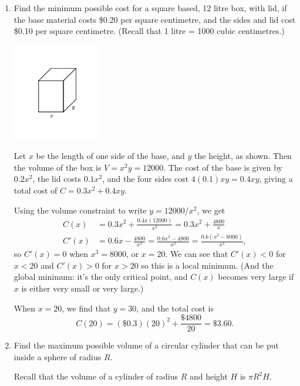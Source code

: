 \documentclass[12pt]{article}
\begin{document}
\begin{enumerate}
   \item Find the minimum possible cost for a square based, 12 litre box, with lid, if the base material costs \$0.20 per square centimetre, and the sides and lid cost \$0.10 per square centimetre. (Recall that 1 litre = 1000 cubic centimetres.)

  \begin{multicols}{2}
  \begin{center}
  \includegraphics[width=0.3\textwidth]{Tut9-5sol}
  \end{center}
  
\columnbreak  
  
  Let $x$ be the length of one side of the base, and $y$ the height, as shown. Then the volume of the box is $V=x^2y=12000$. The cost of the base is given by $0.2x^2$, the lid costs $0.1x^2$, and the four sides cost $4(0.1)xy=0.4xy$, giving a total cost of $C=0.3x^2+0.4xy$.
 \end{multicols}
  Using the volume constraint to write $y=12000/x^2$, we get
  \begin{align*}
  C(x) &= 0.3x^2+\frac{0.4x(12000)}{x^2} = 0.3x^2+\frac{4800}{x}\\
  C'(x) & = 0.6x-\frac{4800}{x^2} = \frac{0.6x^3-4800}{x^2} = \frac{0.6(x^3-8000)}{x^2},
  \end{align*}
  so $C'(x) = 0$ when $x^3=8000$, or $x=20$. We can see that $C'(x)<0$ for $x<20$ and $C'(x)>0$ for $x>20$ so this is a local minimum. (And the global minimum: it's the only critical point, and $C(x)$ becomes very large if $x$ is either very small or very large.)
  
  When $x=20$, we find that $y=30$, and the total cost is
  \[
  C(20) = (\$ 0.3)(20)^2+\frac{\$ 4800}{20} = \$ 3.60.
  \]
  
  
  \item Find the maximum possible volume of a circular cylinder that can be put inside a sphere of radius $R$.
  
  Recall that the volume of a cylinder of radius $R$ and height $H$ is $\pi R^2H$.
  

\end{enumerate}
\end{document}
